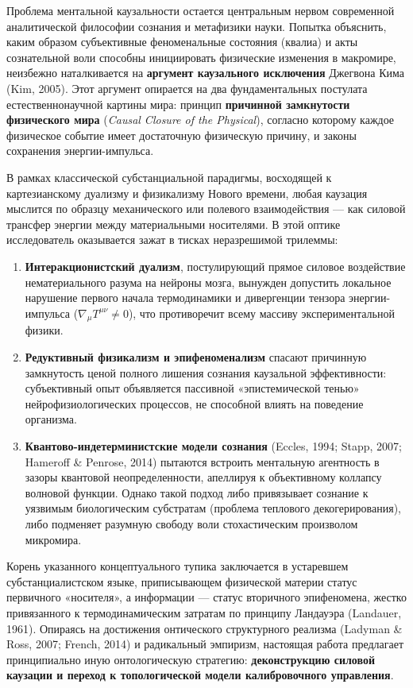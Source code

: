 \documentclass[12pt,a4paper]{article}
\begin{document}
Проблема ментальной каузальности остается центральным нервом современной аналитической философии сознания и метафизики науки. Попытка объяснить, каким образом субъективные феноменальные состояния (квалиа) и акты сознательной воли способны инициировать физические изменения в макромире, неизбежно наталкивается на \textbf{аргумент каузального исключения} Джегвона Кима (Kim, 2005). Этот аргумент опирается на два фундаментальных постулата естественнонаучной картины мира: принцип \textbf{причинной замкнутости физического мира} (\textit{Causal Closure of the Physical}), согласно которому каждое физическое событие имеет достаточную физическую причину, и законы сохранения энергии-импульса.

В рамках классической субстанциальной парадигмы, восходящей к картезианскому дуализму и физикализму Нового времени, любая каузация мыслится по образцу механического или полевого взаимодействия --- как силовой трансфер энергии между материальными носителями. В этой оптике исследователь оказывается зажат в тисках неразрешимой трилеммы:
\begin{enumerate}
    \item \textbf{Интеракционистский дуализм}, постулирующий прямое силовое воздействие нематериального разума на нейроны мозга, вынужден допустить локальное нарушение первого начала термодинамики и дивергенции тензора энергии-импульса ($\nabla_\mu T^{\mu\nu} \neq 0$), что противоречит всему массиву экспериментальной физики.
    \item \textbf{Редуктивный физикализм и эпифеноменализм} спасают причинную замкнутость ценой полного лишения сознания каузальной эффективности: субъективный опыт объявляется пассивной «эпистемической тенью» нейрофизиологических процессов, не способной влиять на поведение организма.
    \item \textbf{Квантово-индетерминистские модели сознания} (Eccles, 1994; Stapp, 2007; Hameroff \& Penrose, 2014) пытаются встроить ментальную агентность в зазоры квантовой неопределенности, апеллируя к объективному коллапсу волновой функции. Однако такой подход либо привязывает сознание к уязвимым биологическим субстратам (проблема теплового декогерирования), либо подменяет разумную свободу воли стохастическим произволом микромира.
\end{enumerate}

Корень указанного концептуального тупика заключается в устаревшем субстанциалистском языке, приписывающем физической материи статус первичного «носителя», а информации --- статус вторичного эпифеномена, жестко привязанного к термодинамическим затратам по принципу Ландауэра (Landauer, 1961). Опираясь на достижения онтического структурного реализма (Ladyman \& Ross, 2007; French, 2014) и радикальный эмпиризм, настоящая работа предлагает принципиально иную онтологическую стратегию: \textbf{деконструкцию силовой каузации и переход к топологической модели калибровочного управления}.
\end{document}
